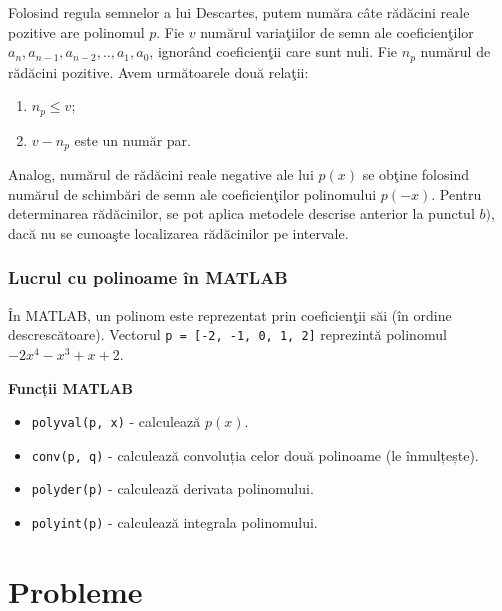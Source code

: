 \documentclass{exam}
\begin{document}
Folosind regula semnelor a lui Descartes, putem număra câte rădăcini reale
pozitive are polinomul $p$. Fie $v$ numărul variaţiilor de semn ale
coeficienţilor $a_{n}, a_{n-1}, a_{n-2},.., a_{1},a_{0}$, ignorând coeficienţii
care sunt nuli. Fie $n_{p}$ numărul de rădăcini pozitive. Avem următoarele două
relaţii:
\begin{enumerate}
	\item $n_{p}\leq v$;
	\item $v-n_{p}$ este un număr par.
\end{enumerate}

Analog, numărul de rădăcini reale negative ale lui $p(x)$ se obţine folosind numărul de schimbări de semn ale coeficienţilor polinomului  $p(-x)$.
Pentru determinarea rădăcinilor, se pot aplica metodele descrise anterior la punctul $b)$, dacă nu se cunoaşte localizarea rădăcinilor pe intervale.

\subsubsection{Lucrul cu polinoame în MATLAB}

În MATLAB, un polinom este reprezentat prin coeficienţii săi (în ordine descrescătoare). Vectorul \verb|p = [-2, -1, 0, 1, 2]| reprezintă polinomul $-2x^{4}-x^{3}+x+2$.

\textbf{Funcții MATLAB}
\begin{itemize}
	\item \verb|polyval(p, x)| - calculează $p(x)$.
	\item \verb|conv(p, q)| - calculează convoluția celor două polinoame (le înmulțește).
	\item \verb|polyder(p)| - calculează derivata polinomului.
	\item \verb|polyint(p)| - calculează integrala polinomului.
\end{itemize}

\section{Probleme}
\end{document}
